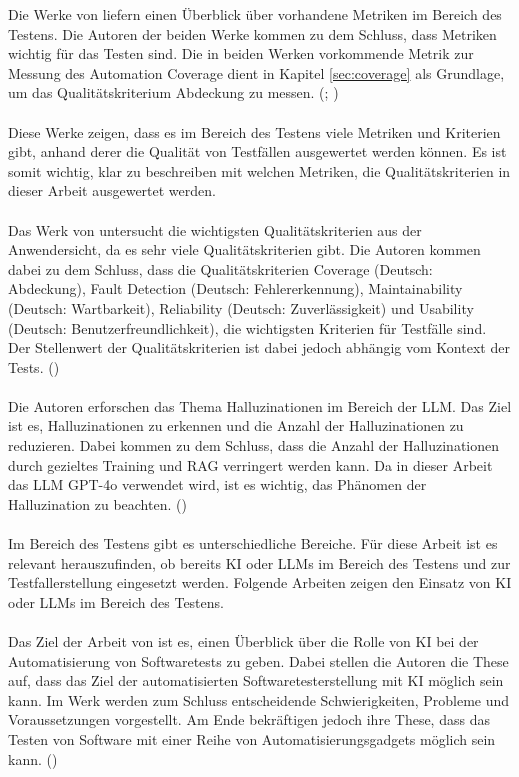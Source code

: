 \documentclass[12pt,toc=bib,toc=listof]{scrreprt}
\begin{document}
\noindent Die Werke von \parencite{Nirpals2011, Lazić2013} liefern einen Überblick über vorhandene Metriken im Bereich des Testens. Die Autoren der beiden Werke \parencite{Nirpals2011, Lazić2013} kommen zu dem Schluss, dass Metriken wichtig für das Testen sind. Die in beiden Werken vorkommende Metrik zur Messung des Automation Coverage dient in Kapitel \ref{sec:coverage} als Grundlage, um das Qualitätskriterium Abdeckung zu messen. (\cite{Nirpals2011}; \cite{Lazić2013})\\
\\
Diese Werke zeigen, dass es im Bereich des Testens viele Metriken und Kriterien gibt, anhand derer die Qualität von Testfällen ausgewertet werden können. Es ist somit wichtig, klar zu beschreiben mit welchen Metriken, die Qualitätskriterien in dieser Arbeit ausgewertet werden.\\
\\
Das Werk von \textcite{Tran2025} untersucht die wichtigsten Qualitätskriterien aus der Anwendersicht, da es sehr viele Qualitätskriterien gibt. Die Autoren \textcite{Tran2025} kommen dabei zu dem Schluss, dass die Qualitätskriterien Coverage (Deutsch: Abdeckung), Fault Detection (Deutsch: Fehlererkennung), Maintainability (Deutsch: Wartbarkeit), Reliability (Deutsch: Zuverlässigkeit) und Usability (Deutsch: Benutzerfreundlichkeit), die wichtigsten Kriterien für Testfälle sind. Der Stellenwert der Qualitätskriterien ist dabei jedoch abhängig vom Kontext der Tests. (\cite{Tran2025})\\
\\
Die Autoren \textcite{Li2024} erforschen das Thema Halluzinationen im Bereich der LLM. Das Ziel ist es, Halluzinationen zu erkennen und die Anzahl der Halluzinationen zu reduzieren. Dabei kommen \textcite{Li2024} zu dem Schluss, dass die Anzahl der Halluzinationen durch gezieltes Training und RAG verringert werden kann. Da in dieser Arbeit das LLM GPT-4o verwendet wird, ist es wichtig, das Phänomen der Halluzination zu beachten.
(\cite{Li2024})\\
\\
Im Bereich des Testens gibt es unterschiedliche Bereiche. Für diese Arbeit ist es relevant herauszufinden, ob bereits KI oder LLMs im Bereich des Testens und zur Testfallerstellung eingesetzt werden. Folgende Arbeiten zeigen den Einsatz von KI oder LLMs im Bereich des Testens.\\
\\
Das Ziel der Arbeit von \textcite{Khan2024} ist es, einen Überblick über die Rolle von KI bei der Automatisierung von Softwaretests zu geben. Dabei stellen die Autoren \textcite{Khan2024} die These auf, dass das Ziel der automatisierten Softwaretesterstellung mit KI möglich sein kann. Im Werk werden zum Schluss entscheidende Schwierigkeiten, Probleme und Voraussetzungen vorgestellt. Am Ende bekräftigen \textcite{Khan2024} jedoch ihre These, dass das Testen von Software mit einer Reihe von Automatisierungsgadgets möglich sein kann. (\cite{Khan2024})\\
\newpage
\end{document}
